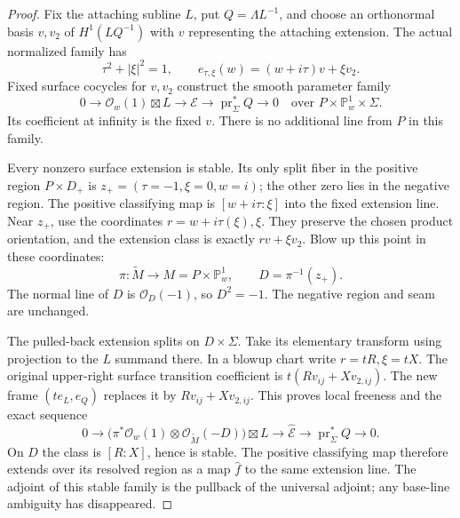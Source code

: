 \documentclass[11pt]{amsart}
\theoremstyle{definition}
\theoremstyle{remark}
\theoremstyle{plain}
\begin{document}
\begin{proof}
Fix the attaching subline $L$, put $Q=\Lambda L^{-1}$, and
choose an orthonormal basis $v,v_2$ of $H^1(LQ^{-1})$ with
$v$ representing the attaching extension. The actual normalized
family has
\[
       \tau^2+|\xi|^2=1,\qquad
       e_{\tau,\xi}(w)=(w+i\tau)v+\xi v_2.
\]
Fixed surface cocycles for $v,v_2$ construct the smooth
parameter family
\begin{equation}\label{eq:genus-two-raw-point-family}
 0\longrightarrow \mathcal O_w(1)\boxtimes L
   \longrightarrow\mathcal E
   \longrightarrow\operatorname{pr}_\Sigma^*Q
   \longrightarrow0
       \quad\text{over }P\times\mathbb P^1_w\times\Sigma.
\end{equation}
Its coefficient at infinity is the fixed $v$. There is no
additional line from $P$ in this family.

Every nonzero surface extension is stable. Its only split
fiber in the positive region $P\times D_+$ is
$z_+=(\tau=-1,\xi=0,w=i)$; the other zero lies in
the negative region. The positive classifying map is
$[w+i\tau:\xi]$ into the fixed extension line.
Near $z_+$, use the coordinates $r=w+i\tau(\xi),\xi$.
They preserve the chosen product orientation, and the
extension class is exactly $rv+\xi v_2$.
Blow up this point in these coordinates:
\[
        \pi:\widetilde M\longrightarrow
                   M=P\times\mathbb P^1_w,\qquad
        D=\pi^{-1}(z_+).
\]
The normal line of $D$ is $\mathcal O_D(-1)$, so $D^2=-1$.
The negative region and seam are unchanged.

The pulled-back extension splits on $D\times\Sigma$.
Take its elementary transform using projection to the
$L$ summand there. In a blowup chart write $r=tR,\xi=tX$.
The original upper-right surface transition coefficient
is $t(Rv_{ij}+Xv_{2,ij})$. The new frame
$(t e_L,e_Q)$ replaces it by $Rv_{ij}+Xv_{2,ij}$.
This proves local freeness and the exact sequence
\begin{equation}\label{eq:genus-two-resolved-point-family}
 0\longrightarrow
   \bigl(\pi^*\mathcal O_w(1)\otimes\mathcal O_{\widetilde M}(-D)\bigr)
                                         \boxtimes L
   \longrightarrow\widehat{\mathcal E}
   \longrightarrow\operatorname{pr}_\Sigma^*Q
   \longrightarrow0.
\end{equation}
On $D$ the class is $[R:X]$, hence is stable. The positive
classifying map therefore extends over its resolved region
as a map $\widehat f$ to the same extension line. The
adjoint of this stable family is the pullback of the
universal adjoint; any base-line ambiguity has disappeared.


\end{proof}
\end{document}
